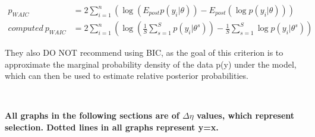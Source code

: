 \documentclass[11pt]{labbook}
\begin{document}
\begin{align*}
p_{WAIC} &= 2 \sum_{i=1}^n\left(\log{(E_{post}p(y_i|\theta))} - E_{post}(\log{p(y_i|\theta)})\right) \\
computed\ p_{WAIC} &= 2 \sum_{i=1}^n\left(\log{\left(\frac{1}{S} \sum_{s=1}^S p(y_i|\theta^s)\right)} - \frac{1}{S}\sum_{s=1}^S\log{p(y_i|\theta^s)}\right)
\end{align*}

They also DO NOT recommend using BIC, as the goal of this criterion is to approximate the marginal probability density of the data p(y) under the model, which can then be used to estimate relative posterior probabilities. 




\

\textbf{All graphs in the following sections are of $\Delta\eta$ values, which represent selection. Dotted lines in all graphs represent y=x.}
\end{document}
